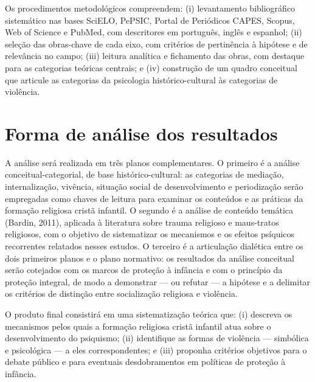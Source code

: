 \documentclass[
    a4paper,
    12pt,
    oneside,
    section=TITLE,
    brazilian,
    english
]{abntex2}
\begin{document}
Os procedimentos metodológicos compreendem: (i) levantamento bibliográfico sistemático nas bases SciELO, PePSIC, Portal de Periódicos CAPES, Scopus, Web of Science e PubMed, com descritores em português, inglês e espanhol; (ii) seleção das obras-chave de cada eixo, com critérios de pertinência à hipótese e de relevância no campo; (iii) leitura analítica e fichamento das obras, com destaque para as categorias teóricas centrais; e (iv) construção de um quadro conceitual que articule as categorias da psicologia histórico-cultural às categorias de violência.

\section{Forma de análise dos resultados}

A análise será realizada em três planos complementares. O primeiro é a análise conceitual-categorial, de base histórico-cultural: as categorias de mediação, internalização, vivência, situação social de desenvolvimento e periodização serão empregadas como chaves de leitura para examinar os conteúdos e as práticas da formação religiosa cristã infantil. O segundo é a análise de conteúdo temática (Bardin, 2011), aplicada à literatura sobre trauma religioso e maus-tratos religiosos, com o objetivo de sistematizar os mecanismos e os efeitos psíquicos recorrentes relatados nesses estudos. O terceiro é a articulação dialética entre os dois primeiros planos e o plano normativo: os resultados da análise conceitual serão cotejados com os marcos de proteção à infância e com o princípio da proteção integral, de modo a demonstrar --- ou refutar --- a hipótese e a delimitar os critérios de distinção entre socialização religiosa e violência.

O produto final consistirá em uma sistematização teórica que: (i) descreva os mecanismos pelos quais a formação religiosa cristã infantil atua sobre o desenvolvimento do psiquismo; (ii) identifique as formas de violência --- simbólica e psicológica --- a eles correspondentes; e (iii) proponha critérios objetivos para o debate público e para eventuais desdobramentos em políticas de proteção à infância.

\end{document}

